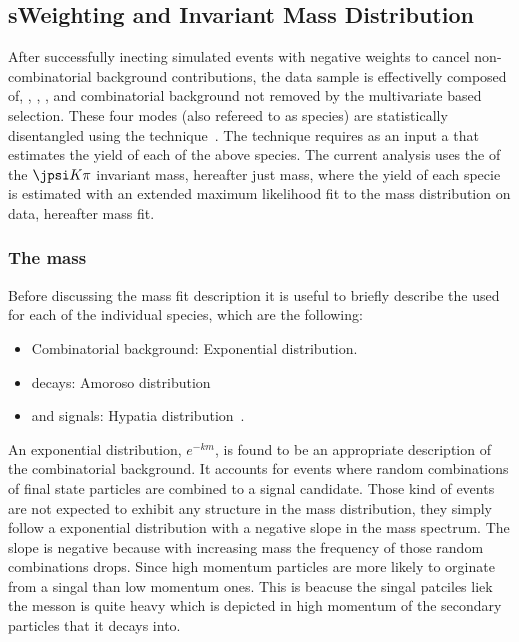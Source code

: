 \subsection{sWeighting and Invariant Mass Distribution}
\label{sWeighting_and_mass}

After successfully inecting simulated events with negative weights to cancel non-combinatorial background contributions,
the data sample is effectivelly composed of, \BdJpsiKpi, \BsJpsiKpi, \LbJpsippi, and combinatorial background not removed by the
multivariate based selection. These four modes (also refereed to as species) are statistically
disentangled using the \sPlot technique~\cite{splot}. The technique requires as an input a \pdf that estimates the yield of each
of the above species. The current analysis uses the \pdf of the $\jpsi K\pi$ invariant mass, hereafter just mass, where the yield of each specie
is estimated with an extended maximum likelihood fit to the mass distribution on data, hereafter mass fit.

\subsubsection{The mass \pdf}
Before discussing the mass fit description it is useful to briefly describe the \pdfs used for each of the individual species, which are the following:

\begin{itemize}
\item Combinatorial background: Exponential distribution.
\item \LbJpsippi decays: Amoroso distribution~\cite{Amoroso}
\item \Bd and \Bs signals: Hypatia distribution~\cite{Santos:2013gra}.
\end{itemize}

\noindent An exponential distribution, $e^{-km}$, is found to be an appropriate description of the combinatorial background. It  accounts
for events where random combinations of final state particles are combined to a signal candidate. Those kind of events are not expected to
exhibit any structure in the mass distribution, they simply follow a exponential distribution with a negative slope in the mass spectrum.
The slope is negative because with increasing mass the frequency of those random combinations drops. Since high momentum particles are more
likely to orginate from a singal than low momentum ones. This is beacuse the singal patciles liek the \Bs messon is quite heavy which is
depicted in high momentum of the secondary particles that it decays into.


